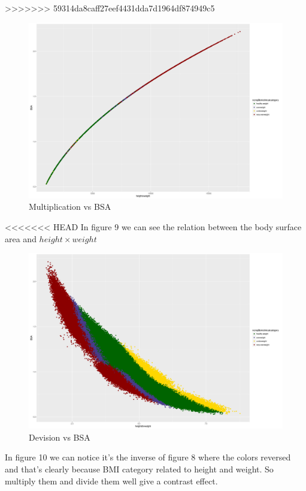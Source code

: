 \documentclass{article}
\begin{document}
>>>>>>> 59314da8caff27eef4431dda7d1964df874949c5
		\begin{figure}[H]
			\begin{center}
				\includegraphics[scale=0.4]{xbsa.png}
			\end{center}
			\caption{Multiplication vs BSA}
		\end{figure}
<<<<<<< HEAD
In figure 9 we can see the relation between the body surface area and \(height\times weight\)
	\begin{figure}[H]
		\begin{center}
			\includegraphics[scale=0.4]{divbsa.png}
		\end{center}
		\caption{Devision vs BSA}
	\end{figure}
	In figure 10 we can notice it's the inverse of figure 8 where the colors reversed and that's clearly because BMI category related to height and weight. So multiply them and divide them well give a contrast effect.
\end{document}
